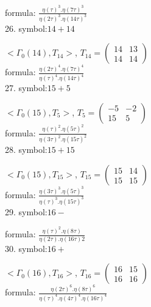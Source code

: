 formula: 
$ \frac{\eta(\tau)^3 . \eta(7\tau)^3}{\eta(2\tau)^3 . \eta(14\tau)^3} $
\\

26. symbol:$ 14+14 $

$ < \Gamma_0 ( 14 ), T_{14} >  $,
$
T_{14} = 
\left(
\begin{array}{cc}
14 & 13 \\
14 & 14
\end{array}
\right)
$
\\

formula: 
$ \frac{\eta(2\tau)^4 . \eta(7\tau)^4}{\eta(\tau)^4 . \eta(14\tau)^4} $
\\

27. symbol:$ 15+5 $

$ < \Gamma_0 ( 15 ), T_{5} >  $,
$
T_{5} = 
\left(
\begin{array}{cc}
-5 & -2 \\
15 & 5
\end{array}
\right)
$
\\

formula: 
$ \frac{\eta(\tau)^2 . \eta(5\tau)^2}{\eta(3\tau)^2 . \eta(15\tau)^2} $
\\

28. symbol:$ 15+15 $

$ < \Gamma_0 ( 15 ), T_{15} >  $,
$
T_{15} = 
\left(
\begin{array}{cc}
15 & 14 \\
15 & 15
\end{array}
\right)
$
\\

formula: 
$ \frac{\eta(3\tau)^3 . \eta(5\tau)^3}{\eta(\tau)^3 . \eta(15\tau)^3} $
\\

29. symbol:$ 16- $

formula: 
$ \frac{\eta(\tau)^2 . \eta(8\tau)}{\eta(2\tau) . \eta(16\tau)2} $
\\

30. symbol:$ 16+ $

$ < \Gamma_0 ( 16 ), T_{16} >  $,
$
T_{16} = 
\left(
\begin{array}{cc}
16 & 15 \\
16 & 16
\end{array}
\right)
$
\\

formula: 
$ \frac{\eta(2\tau)^6 . \eta(8\tau)^6}{\eta(\tau)^4 . \eta(4\tau)^4. \eta(16\tau)^4} $
\\



